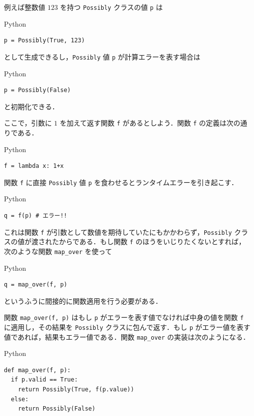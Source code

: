 \documentclass[a4paper,twocolumn]{jsbook}
\newcommand{\programminglanguage}[1]{\textsf{#1}}
\newcommand{\python}{\programminglanguage{Python}}
\newcommand{\code}[1]{\texttt{#1}}
\newenvironment{pythoncode}{\begin{itembox}[r]{\python}}{\end{itembox}}
\begin{document}
例えば整数値 $123$ を持つ \code{Possibly} クラスの値 \code{p} は
\begin{pythoncode}
\begin{verbatim}
p = Possibly(True, 123)
\end{verbatim}
\end{pythoncode}
として生成できるし，\code{Possibly} 値 \code{p} が計算エラーを表す場合は
\begin{pythoncode}
\begin{verbatim}
p = Possibly(False)
\end{verbatim}
\end{pythoncode}
と初期化できる．

ここで，引数に $1$ を加えて返す関数 \code{f} があるとしよう．関数 \code{f} の定義は次の通りである．
\begin{pythoncode}
\begin{verbatim}
f = lambda x: 1+x
\end{verbatim}
\end{pythoncode}

関数 \code{f} に直接 \code{Possibly} 値 \code{p} を食わせるとランタイムエラーを引き起こす．
\begin{pythoncode}
\begin{verbatim}
q = f(p) # エラー!!
\end{verbatim}
\end{pythoncode}
これは関数 \code{f} が引数として数値を期待していたにもかかわらず，\code{Possibly} クラスの値が渡されたからである．もし関数 \code{f} のほうをいじりたくないとすれば，次のような関数 \code{map\_over} を使って
\begin{pythoncode}
\begin{verbatim}
q = map_over(f, p)
\end{verbatim}
\end{pythoncode}
というふうに間接的に関数適用を行う必要がある．

関数 \code{map\_over(f, p)} はもし \code{p} がエラーを表す値でなければ中身の値を関数 \code{f} に適用し，その結果を \code{Possibly} クラスに包んで返す．もし \code{p} がエラー値を表す値であれば，結果もエラー値である．関数 \code{map\_over} の実装は次のようになる．
\begin{pythoncode}
\begin{verbatim}
def map_over(f, p):
  if p.valid == True:
    return Possibly(True, f(p.value))
  else:
    return Possibly(False)
\end{verbatim}
\end{pythoncode}
\end{document}
